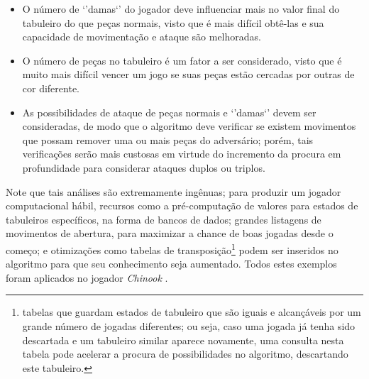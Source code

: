 \documentclass{article}
\begin{document}
\begin{enumerate}[label=\textbf{\arabic*})]
\begin{itemize}
        \item O número de `'damas`' do jogador deve influenciar mais no valor
        final do tabuleiro do que peças normais, visto que é mais difícil
        obtê-las e sua capacidade de movimentação e ataque são melhoradas.

        \item O número de peças no tabuleiro é um fator a ser considerado,
        visto que é muito mais difícil vencer um jogo se suas peças estão
        cercadas por outras de cor diferente.

        \item As possibilidades de ataque de peças normais e `'damas`' devem
        ser consideradas, de modo que o algoritmo deve verificar se existem
        movimentos que possam remover uma ou mais peças do adversário; porém,
        tais verificações serão mais custosas em virtude do incremento da
        procura em profundidade para considerar ataques duplos ou triplos.

    \end{itemize}

    Note que tais análises são extremamente ingênuas; para produzir um
    jogador computacional hábil, recursos como a pré-computação de valores
    para estados de tabuleiros específicos, na forma de bancos de dados;
    grandes listagens de movimentos de abertura, para maximizar a chance de
    boas jogadas desde o começo; e otimizações como tabelas de
    transposição\footnote{tabelas que guardam estados de tabuleiro que são
    iguais e alcançáveis por um grande número de jogadas diferentes;
    ou seja, caso uma jogada já tenha sido descartada e um tabuleiro similar
    aparece novamente, uma consulta nesta tabela pode acelerar a procura de
    possibilidades no algoritmo, descartando este tabuleiro.} podem ser
    inseridos no algoritmo para que seu conhecimento seja aumentado.
    Todos estes exemplos foram aplicados no jogador \textit{Chinook}
    \cite{Schaeffer1989}.

\end{enumerate}



\end{document}
